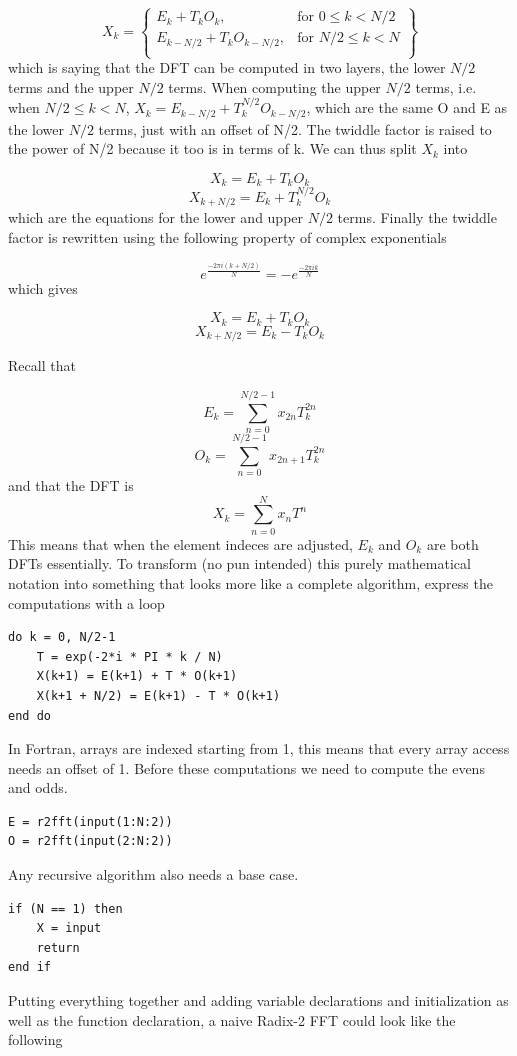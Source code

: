 \[
X_k = \left\{\begin{array}{lr}
    E_k + T_kO_k, & \text{for } 0 \leq k < N/2\\
    E_{k-N/2} + T_kO_{k-N/2}, & \text{for } N/2\leq k< N\\
    \end{array}\right\}
\]
which is saying that the DFT can be computed in two layers, the lower $N/2$ terms and the upper $N/2$ terms.
When computing the upper $N/2$ terms, i.e. when $N/2 \leq k < N$, $X_k = E_{k-N/2} + T_k^{N/2}O_{k-N/2}$, which are the same O and E as the lower $N/2$ terms, just with an offset of N/2. The twiddle factor is raised to the power of N/2 because it too is in terms of k. We can thus split $X_k$ into 

$$X_k = E_k + T_kO_k$$  
$$X_{k+N/2} = E_k + T_k^{N/2}O_k$$
which are the equations for the lower and upper $N/2$ terms. Finally the twiddle factor is rewritten using the following property of complex exponentials

$$e^{\frac{-2\pi i(k+N/2)}{N}} = -e^{\frac{-2\pi ik}{N}}$$
which gives

$$X_k = E_k + T_kO_k$$  
$$X_{k+N/2} = E_k - T_kO_k$$

Recall that

$$E_k = \sum^{N/2-1}_{n=0} x_{2n}T_k^{2n}$$
$$O_k = \sum^{N/2-1}_{n=0} x_{2n+1}T_k^{2n}$$
and that the DFT is
$$X_k = \sum^{N}_{n=0} x_nT^{n}$$
This means that when the element indeces are adjusted, $E_k$ and $O_k$ are both DFTs essentially. To transform (no pun intended)  this purely mathematical notation into something that looks more like a complete algorithm, express the computations with a loop

\begin{lstlisting}
do k = 0, N/2-1
    T = exp(-2*i * PI * k / N) 
    X(k+1) = E(k+1) + T * O(k+1)
    X(k+1 + N/2) = E(k+1) - T * O(k+1)
end do
\end{lstlisting}
In Fortran, arrays are indexed starting from 1, this means that every array access needs an offset of 1. Before these computations we need to compute the evens and odds.
\begin{lstlisting}
E = r2fft(input(1:N:2))
O = r2fft(input(2:N:2))
\end{lstlisting}
Any recursive algorithm also needs a base case.
\begin{lstlisting}    
if (N == 1) then
    X = input
    return
end if
\end{lstlisting}
Putting everything together and adding variable declarations and initialization as well as the function declaration, a naive Radix-2 FFT could look like the following

